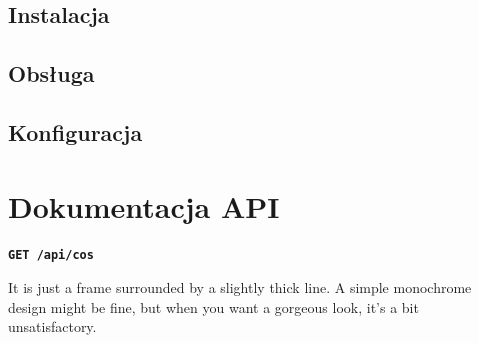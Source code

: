 \documentclass{./assets/wfis}
\begin{document}
\section{Instalacja}
\section{Obsługa}
\section{Konfiguracja}
\chapter{Dokumentacja API}\label{api}

\begin{boxA}
\textbf{\texttt{GET /api/cos}}

It is just a frame surrounded by a slightly thick line. A simple monochrome design might be fine, but when you want a gorgeous look, it's a bit unsatisfactory.
\end{boxA}

\end{document}
